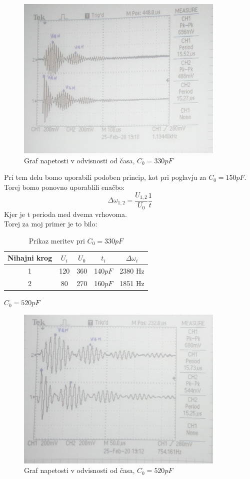 \documentclass[11pt, a4paper]{article}
\theoremstyle{definition}
\theoremstyle{example}
\theoremstyle{izrek}
\begin{document}
\begin{figure}[htp]
    \centering
    \includegraphics[width=10cm]{C=330.jpg}
    \caption{Graf napetosti v odvisnosti od časa, $C_0=330 pF$}
\end{figure}

Pri tem delu bomo uporabili podoben princip, kot pri poglavju za $C_0=150pF$. Torej bomo ponovno uporablili enačbo:
$$\Delta \omega_{1,2}=\frac{U_{1,2}}{U_0}\frac{1}{t} $$
Kjer je t perioda med dvema vrhovoma.\\
Torej za moj primer je to bilo: \\
\begin{table}[ht]
	\centering
	\begin{tabular}{|c|c|c|c|c|}
		\hline
		Nihajni krog & $U_i$ & $U_0$ & $ t_i$ & $\Delta \omega_i$ \\
		\hline
		\hline
		1 & 120 & 360 & 140$pF$ & 2380 Hz \\
		\hline
		2 & 80 & 270 & 160$pF$ & 1851 Hz \\
		\hline
		\end{tabular}
		\caption{Prikaz meritev pri $C_0=330pF$}
		\label{tab:FirstTable}
\end{table}

\pagebreak
\textbf{\underline{$C_0=520pF$}}\\

\begin{figure}[htp]
    \centering
    \includegraphics[width=10cm]{C=520.jpg}
    \caption{Graf napetosti v odvisnosti od časa, $C_0=520 pF$}
\end{figure}
\end{document}
